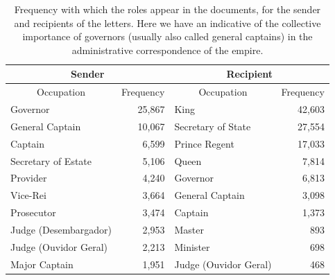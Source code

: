 \documentclass{article}
\begin{document}
\begin{table}[]
	\vspace{0.2cm}
	\centering
	\caption{Frequency with which the roles appear in the documents, for the sender and recipients of the letters. Here we have an indicative of the collective importance of governors (usually also called general captains) in the administrative correspondence of the empire. \label{tb:occupations}}
	\vspace{0.2cm}
	\begin{tabular}{|l|r|l|r|}
	\hline
	\multicolumn{2}{|c|}{Sender}                                      & \multicolumn{2}{c|}{Recipient}                                   \\ \hline
	\multicolumn{1}{|c|}{Occupation} & \multicolumn{1}{c|}{Frequency} & \multicolumn{1}{c|}{Occupation} & \multicolumn{1}{c|}{Frequency} \\ \hline
	Governor                         & 25,867                         & King                            & 42,603                         \\ \hline
	General Captain                  & 10,067                         & Secretary of State              & 27,554                         \\ \hline
	Captain                          & 6,599                          & Prince Regent                   & 17,033                         \\ \hline
	Secretary of Estate              & 5,106                          & Queen                           & 7,814                          \\ \hline
	Provider                         & 4,240                          & Governor                        & 6,813                          \\ \hline
	Vice-Rei                         & 3,664                          & General Captain                 & 3,098                          \\ \hline
	Prosecutor                       & 3,474                          & Captain                         & 1,373                          \\ \hline
	Judge (Desembargador)            & 2,953                          & Master                          & 893                            \\ \hline
	Judge (Ouvidor Geral)            & 2,213                          & Minister                        & 698                            \\ \hline
	Major Captain                    & 1,951                          & Judge (Ouvidor Geral)           & 468                            \\ \hline
	\end{tabular}
\end{table}
\end{document}
